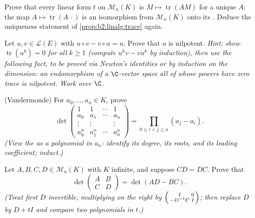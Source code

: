 \begin{exercise}[$\star\star\star$]\label{exo:b2:linalg:9}
Prove that every linear form $t$ on $\mathcal{M}_n(K)$ is $M \mapsto
\operatorname{tr}(AM)$ for a unique $A$: the map $A \mapsto
\operatorname{tr}(A\,\cdot)$ is an isomorphism from
$\mathcal{M}_n(K)$ onto its . Deduce the uniqueness statement of
\cref{prop:b2:linalg:trace} again.
\end{exercise}

\begin{exercise}[$\star\star\star$]\label{exo:b2:linalg:10}
Let $u, v \in \mathcal{L}(E)$ with $u \circ v - v \circ u = u$.
Prove that $u$ is nilpotent. \emph{Hint: show
$\operatorname{tr}(u^k) = 0$ for all $k \geq 1$ (compute $u^k v -
v u^k$ by induction), then use the following fact, to be proved via
Newton's identities or by induction on the dimension: an
endomorphism of a $\C$-vector space all of whose powers have zero
trace is nilpotent. Work over $\C$.}
\end{exercise}

\begin{exercise}[$\star\star$]\label{exo:b2:linalg:11}
(Vandermonde) For $a_0, \dots, a_n \in K$, prove
\[
\det\begin{pmatrix}
1 & 1 & \cdots & 1\\
a_0 & a_1 & \cdots & a_n\\
\vdots & \vdots & & \vdots\\
a_0^n & a_1^n & \cdots & a_n^n
\end{pmatrix}
= \prod_{0 \leq i < j \leq n} (a_j - a_i).
\]
\emph{(View the  as a polynomial in $a_n$: identify its
degree, its roots, and its leading coefficient; induct.)}
\end{exercise}

\begin{exercise}[$\star\star\star$]\label{exo:b2:linalg:12}
Let $A, B, C, D \in \mathcal{M}_n(K)$ with $K$ infinite, and
suppose $CD = DC$. Prove that
\[
\det\begin{pmatrix} A & B\\ C & D\end{pmatrix}
= \det(AD - BC).
\]
\emph{(Treat first $D$ invertible, multiplying on the right by
$\begin{psmallmatrix} I & 0\\ -D^{-1}C & I\end{psmallmatrix}$;
then replace $D$ by $D + tI$ and compare two polynomials in $t$.)}
\end{exercise}

